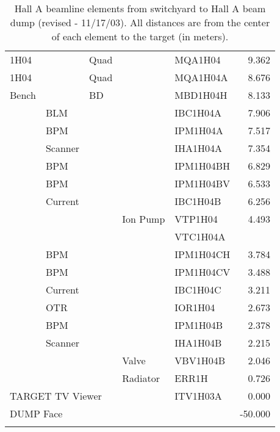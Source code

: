 \begin{longtable}[hpt]{lllllr}
1H04 && Quad && MQA1H04 & 9.362 \\
1H04 && Quad && MQA1H04A & 8.676 \\
\hline
Bench && BD && MBD1H04H & 8.133 \\
& BLM &&& IBC1H04A & 7.906 \\
& BPM &&& IPM1H04A & 7.517 \\
& Scanner &&& IHA1H04A & 7.354 \\
& BPM &&& IPM1H04BH & 6.829 \\
& BPM &&& IPM1H04BV & 6.533 \\
& Current &&& IBC1H04B & 6.256 \\
&&& Ion Pump & VTP1H04 & 4.493 \\
&&&& VTC1H04A & \\
& BPM &&& IPM1H04CH & 3.784 \\
& BPM &&& IPM1H04CV & 3.488 \\
& Current &&& IBC1H04C & 3.211 \\
& OTR &&& IOR1H04 & 2.673 \\
& BPM &&& IPM1H04B & 2.378 \\
& Scanner &&& IHA1H04B & 2.215 \\
&&& Valve & VBV1H04B & 2.046 \\ 
&&& Radiator & ERR1H & 0.726 \\ \hline
\multicolumn{4}{l}{TARGET TV Viewer} & ITV1H03A & 0.000 \\
\hline
\multicolumn{2}{l}{DUMP Face} &&&& -50.000 \\
\hline
\caption[Beamline: Hall A Beamline Elements]{Hall A beamline elements 
  from switchyard to Hall A beam dump (revised - 11/17/03).
  All distances are from the center of each element to the target (in 
  meters).
}
\label{tab:beam_tab1}
\end{longtable}

